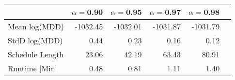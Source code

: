 \begin{tabular} {lrrrrr} 
 \hline \hline 
&$\alpha = $0.90&$\alpha = $0.95&$\alpha = $0.97&$\alpha = $0.98\\ 
 \hline 
Mean log(MDD)&-1032.45&-1032.01&-1031.87&-1031.79\\ 
StdD log(MDD)&0.44&0.23&0.16&0.12\\ 
Schedule Length&23.06&42.19&63.43&80.91\\ 
Runtime [Min]&0.48&0.81&1.11&1.40\\ 
\hline 
\end{tabular}